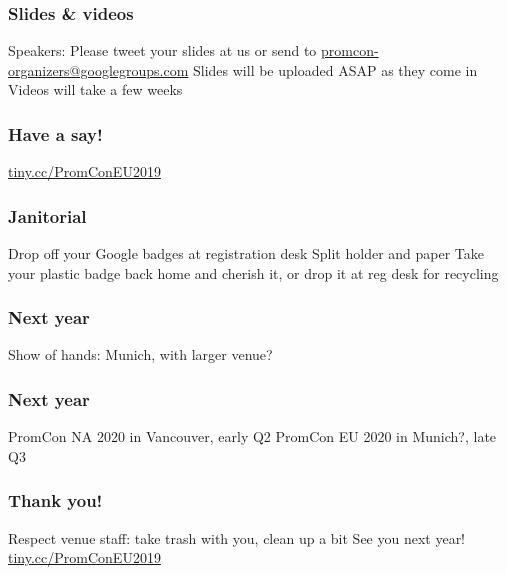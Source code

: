 \documentclass[t]{beamer}
\begin{document}
\begin{frame}
	\frametitle{Slides \& videos}
	\begin{center}
		\vfill
		Speakers: Please tweet your slides at us or send to \url{promcon-organizers@googlegroups.com}
		\vfill
		Slides will be uploaded ASAP as they come in
		\vfill
		Videos will take a few weeks
		\vfill
	\end{center}
\end{frame}

\begin{frame}
	\frametitle{Have a say!}
	\begin{center}
	\vfill
	\url{tiny.cc/PromConEU2019}
	\vfill
	\end{center}
\end{frame}

\begin{frame}
	\frametitle{Janitorial}
	\begin{center}
	\vfill
	Drop off your Google badges at registration desk
	\vfill
	Split holder and paper
	\vfill
	Take your plastic badge back home and cherish it, or drop it at reg desk for recycling
	\vfill
	\end{center}
\end{frame}

\begin{frame}
	\frametitle{Next year}
	\begin{center}
	\vfill
	Show of hands: Munich, with larger venue?
	\vfill
	\end{center}
\end{frame}

\begin{frame}
	\frametitle{Next year}
	\begin{center}
	\vfill
	PromCon NA 2020 in Vancouver, early Q2
	\vfill
	PromCon EU 2020 in Munich?, late Q3
	\vfill
	\end{center}
\end{frame}

\begin{frame}
	\frametitle{Thank you!}
	\begin{center}
	\vfill
	Respect venue staff: take trash with you, clean up a bit
	\vfill
	See you next year!
	\vfill
	\url{tiny.cc/PromConEU2019}
	\vfill
	\end{center}
\end{frame}
\end{document}
